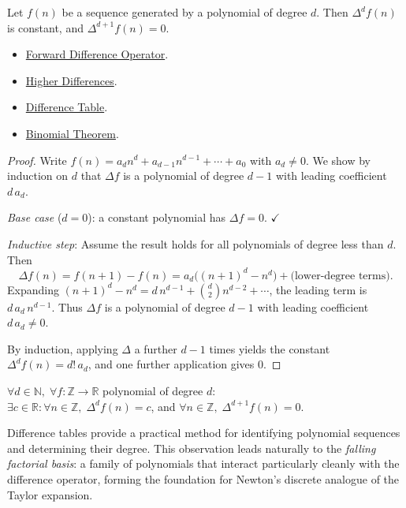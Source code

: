 \begin{theorem}
\label{thm:polynomial-detection}
Let \(f(n)\) be a sequence generated by a polynomial of degree \(d\). Then
\(\Delta^d f(n)\) is constant, and \(\Delta^{d+1} f(n) = 0\).
\end{theorem}

\begin{dependencies}
\begin{itemize}
  \item \hyperref[def:forward-difference]{Forward Difference Operator}.
  \item \hyperref[def:higher-differences]{Higher Differences}.
  \item \hyperref[def:difference-table]{Difference Table}.
  \item \hyperref[thm:binomial]{Binomial Theorem}.
\end{itemize}
\end{dependencies}

\begin{proof}
Write \(f(n) = a_d n^d + a_{d-1}n^{d-1} + \cdots + a_0\) with \(a_d \ne 0\).
We show by induction on \(d\) that \(\Delta f\) is a polynomial of degree
\(d-1\) with leading coefficient \(d\,a_d\).

\emph{Base case} (\(d = 0\)): a constant polynomial has \(\Delta f = 0\). \(\checkmark\)

\emph{Inductive step}: Assume the result holds for all polynomials of degree
less than \(d\). Then
\[
\Delta f(n) = f(n+1)-f(n)
= a_d\bigl((n+1)^d - n^d\bigr) + \text{(lower-degree terms)}.
\]
Expanding \((n+1)^d - n^d = d\,n^{d-1} + \binom{d}{2}n^{d-2} + \cdots\),
the leading term is \(d\,a_d\,n^{d-1}\). Thus \(\Delta f\) is a polynomial
of degree \(d-1\) with leading coefficient \(d\,a_d \ne 0\).

By induction, applying \(\Delta\) a further \(d-1\) times yields the
constant \(\Delta^d f(n) = d!\,a_d\), and one further application gives \(0\).
\end{proof}

\begin{remark*}
\(\forall d \in \mathbb{N},\; \forall f : \mathbb{Z}\to\mathbb{R}\) polynomial of degree \(d\):\\
\(\exists c \in \mathbb{R}: \forall n \in \mathbb{Z},\; \Delta^d f(n) = c\),
and \(\forall n \in \mathbb{Z},\; \Delta^{d+1}f(n) = 0\).
\end{remark*}

\begin{remark*}[Consequence]
Difference tables provide a practical method for identifying polynomial
sequences and determining their degree. This observation leads naturally to
the \emph{falling factorial basis}: a family of polynomials that interact
particularly cleanly with the difference operator, forming the foundation
for Newton's discrete analogue of the Taylor expansion.
\end{remark*}
